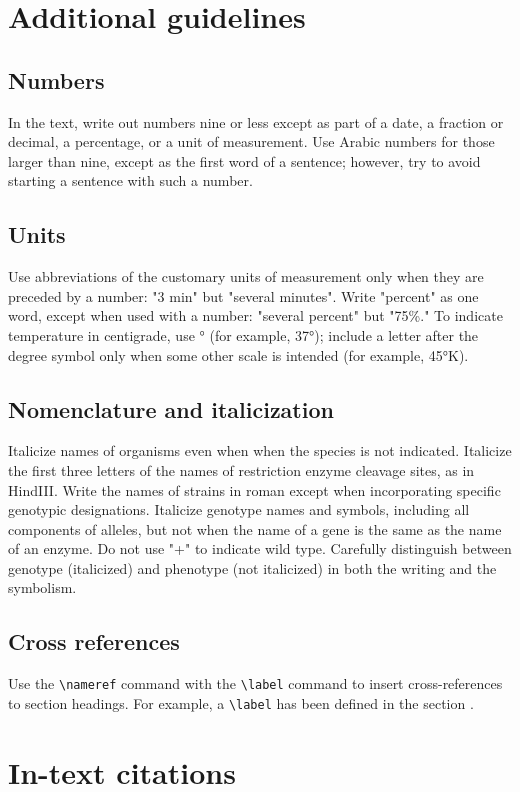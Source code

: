 \documentclass[9pt,twocolumn,twoside,lineno]{gsag3jnl}
\begin{document}
\section{Additional guidelines}

\subsection{Numbers} In the text, write out numbers nine or less except as part of a date, a fraction or decimal, a percentage, or a unit of measurement. Use Arabic numbers for those larger than nine, except as the first word of a sentence; however, try to avoid starting a sentence with such a number.

\subsection{Units} Use abbreviations of the customary units of measurement only when they are preceded by a number: "3 min" but "several minutes". Write "percent" as one word, except when used with a number: "several percent" but "75\%." To indicate temperature in centigrade, use ° (for example, 37°); include a letter after the degree symbol only when some other scale is intended (for example, 45°K).

\subsection{Nomenclature and italicization} Italicize names of organisms even when  when the species is not indicated.  Italicize the first three letters of the names of restriction enzyme cleavage sites, as in HindIII. Write the names of strains in roman except when incorporating specific genotypic designations. Italicize genotype names and symbols, including all components of alleles, but not when the name of a gene is the same as the name of an enzyme. Do not use "+" to indicate wild type. Carefully distinguish between genotype (italicized) and phenotype (not italicized) in both the writing and the symbolism.

\subsection{Cross references}
Use the \verb|\nameref| command with the \verb|\label| command to insert cross-references to section headings. For example, a \verb|\label| has been defined in the section .

\section{In-text citations}
\end{document}
